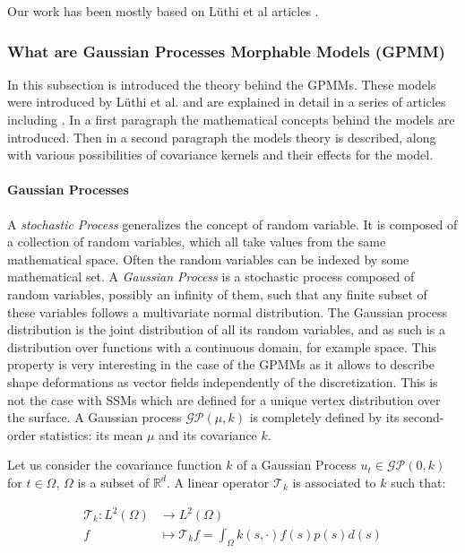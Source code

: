 Our work has been mostly based on Lüthi et al articles \cite{luthi_2013_unified, luthi_2017_shape, luthi_2017_gaussian}. 




\subsubsection{What are Gaussian Processes Morphable Models (GPMM)}
\label{ssubsec:5_GP_what}

In this subsection is introduced the theory behind the GPMMs. These models were introduced by Lüthi et al. and are explained in detail in a series of articles including \cite{luthi_2017_shape, luthi_2017_gaussian}. In a first paragraph the mathematical concepts behind the models are introduced. Then in a second paragraph the models theory is described, along with various possibilities of covariance kernels and their effects for the model. 


\paragraph{Gaussian Processes}
A \textit{stochastic Process} generalizes the concept of random variable. It is composed of a collection of random variables, which all take values from the same mathematical space. Often the random variables can be indexed by some mathematical set. A \textit{Gaussian Process} is a stochastic process composed of random variables, possibly an infinity of them, such that any finite subset of these variables follows a multivariate normal distribution. The Gaussian process distribution is the joint distribution of all its random variables, and as such is a distribution over functions with a continuous domain, for example space. This property is very interesting in the case of the GPMMs as it allows to describe shape deformations as vector fields independently of the discretization. This is not the case with SSMs which are defined for a unique vertex distribution over the surface. A Gaussian process $\mathcal{GP}(\mu,k)$ is completely defined by its second-order statistics: its mean $\mu$ and its covariance $k$. 

Let us consider the covariance function $k$ of a Gaussian Process $u_t \in \mathcal{GP}(0, k)$ for $t \in \Omega$, $\Omega$ is a subset of $\mathbb{R}^d$. A linear operator $\mathcal{T}_k$ is associated to $k$ such that: 

\begin{equation}
	\begin{split}
		\mathcal{T}_k : L^2(\Omega) &\rightarrow L^2(\Omega) \\
						f &\mapsto \mathcal{T}_kf = \int_\Omega k(s,\cdot)f(s)p(s)d(s)
	\end{split}
\end{equation}


